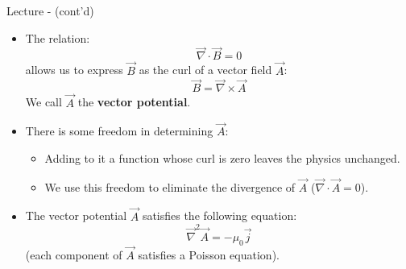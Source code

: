 \begin{frame}{Lecture \summarizedlecture - \lecturesummarytitle (cont'd)}

\begin{itemize}

\item
      The relation:
      \begin{equation*}
              \vec{\nabla} \cdot \vec{B} = 0
      \end{equation*}
      allows us to express $\vec{B}$ as the curl of a vector field  $\vec{A}$:
      \begin{equation*}
             \vec{B} = \vec{\nabla} \times \vec{A}
      \end{equation*}
      We call $\vec{A}$ the {\bf vector potential}.

\item
     There is some freedom in determining $\vec{A}$:
    \begin{itemize}
         \item Adding to it a function whose curl is zero leaves the physics unchanged.
         \item We use this freedom to eliminate the divergence of $\vec{A}$ ($\vec{\nabla} \cdot \vec{A} = 0$).
    \end{itemize}

\item
     The vector potential $\vec{A}$ satisfies the following equation:
     \begin{equation*}
         \vec{\nabla}^2 \vec{A}   =  - \mu_{0} \vec{j}
     \end{equation*}
     (each component of $\vec{A}$ satisfies a Poisson equation).

\end{itemize}

\end{frame}
